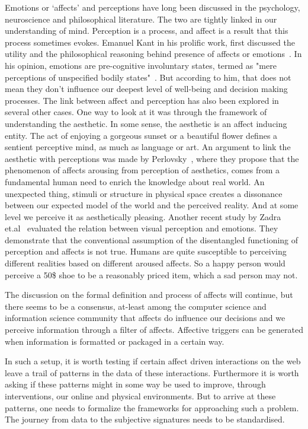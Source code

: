 Emotions or `affects' and perceptions have long been discussed in the psychology, neuroscience and philosophical literature. The two are tightly linked in our understanding of mind. Perception is a process, and affect is a result that this process sometimes evokes.  
Emanuel Kant in his prolific work, first discussed the utility and the philosophical reasoning behind presence of affects or emotions~\cite{kant1987critique}. In his opinion, emotions are pre-cognitive involuntary states, termed as "mere perceptions of unspecified bodily states"~\cite{borges2004can}. 
But according to him, that does not mean they don't influence our deepest level of well-being and decision making processes.
The link between affect and perception has also been explored in several other cases. One way to look at it was through the framework of understanding the aesthetic. In some sense, the aesthetic is an affect inducing entity. The act of enjoying a gorgeous sunset or a beautiful flower defines a sentient perceptive mind, as much as language or art.  
An argument to link the aesthetic with perceptions was made by Perlovsky~\cite{perlovsky2014aesthetic}, where they propose that the phenomenon of affects arousing from perception of aesthetics, comes from a fundamental human need to enrich the knowledge about real world. An unexpected thing, stimuli or structure in physical space creates a dissonance between our expected model of the world and the perceived reality. And at some level we perceive it as aesthetically pleasing. Another recent study by Zadra et.al~\cite{zadra2011emotion} evaluated the relation between visual perception and emotions. They demonstrate that the conventional assumption of the disentangled functioning of perception and affects is not true. Humans are quite susceptible to perceiving different realities based on different aroused affects. So a happy person would perceive a 50\$ shoe to be a reasonably priced item, which a sad person may not. 

The discussion on the formal definition and process of affects will continue, but there seems to be a consensus, at-least among the computer science and information science community that affects do influence our decisions and we perceive information through a filter of affects. Affective triggers can be generated when information is formatted or packaged in a certain way. 

In such a setup, it is worth testing if certain affect driven interactions on the web leave a trail of patterns in the data of these interactions. Furthermore it is worth asking if these patterns might in some way be used to improve, through interventions, our online and physical environments. But to arrive at these patterns, one needs to formalize the frameworks for approaching such a problem. 
The journey from data to the subjective signatures needs to be standardised. 

